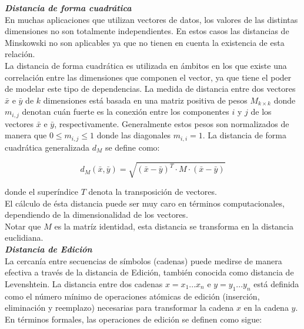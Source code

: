 \noindent \textbf{\textit{Distancia de  forma cuadr\'atica}}\\

En muchas aplicaciones que utilizan vectores de datos, los valores de las distintas 
dimensiones no son totalmente independientes. En estos casos las distancias de Minskowski
no son aplicables ya que no tienen en cuenta la existencia de esta relaci\'on.\\

La distancia de forma cuadr\'atica  es utilizada en \'ambitos en los que existe
 una correlaci\'on entre  las dimensiones que componen el vector, ya que tiene 
 el poder de modelar este tipo de  dependencias. La medida de distancia entre 
 dos vectores $\bar{x}$ e $\bar{y}$  de $k$ dimensiones est\'a basada en una matriz
 positiva de pesos   $M_{k \times k}$ donde 
$m_{i,j}$  denotan cu\'an fuerte es la conexi\'on entre los componentes $i$ y $j$ de los vectores 
$\bar{x}$ e $\bar{y}$, respectivamente. Generalmente estos pesos son normalizados de manera que 
$0\leq m_{i,j} \leq 1$ donde las diagonales $m_{i,	i} = 1$.
La distancia de forma  cuadr\'atica generalizada $d_M$ se define como:

\[
d_M(\bar{x},\bar{y}) = \sqrt{(\bar{x} - \bar{y})^T \cdot M \cdot (\bar{x} - \bar{y})}
\]

\noindent donde el super\'indice $T$ denota la transposici\'on de vectores.\\

El c\'alculo de \'esta distancia puede ser muy caro en t\'erminos computacionales, dependiendo de la dimensionalidad de los vectores.\\
Notar que $M$ es la matr\'iz identidad, esta distancia se transforma en la distancia
euclidiana.\\

\noindent \textbf{\textit{Distancia de Edici\'on}}\\

La cercan\'ia entre secuencias de s\'imbolos (cadenas) puede medirse de manera efectiva a trav\'es 
de la distancia de Edici\'on, tambi\'en conocida como distancia de Levenshtein. La distancia entre 
dos cadenas $x=x_1...x_n$ e $y=y_1...y_n$ est\'a definida como el n\'umero m\'inimo de operaciones 
at\'omicas de edici\'on (inserci\'on, eliminaci\'on y reemplazo) necesarias para transformar la 
cadena $x$ en la cadena $y$. En t\'erminos formales, las operaciones de edici\'on se definen como 
sigue:

